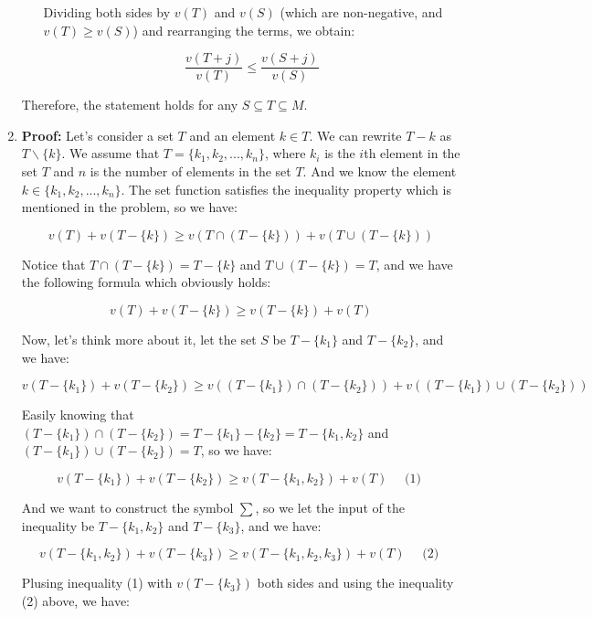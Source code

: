 \documentclass{article}
\begin{document}
\begin{enumerate}
\begin{enumerate}
      Dividing both sides by $v(T)$ and $v(S)$ (which are non-negative, and $v(T) \ge v(S)$) and rearranging the terms, we obtain:
   
      \[
         \frac{v(T+j)}{v(T)} \le \frac{v(S+j)}{v(S)}
      \]

   \end{enumerate}

   Therefore, the statement holds for any $S \subseteq T \subseteq M$.
   
   
   
   

   \item \textbf{Proof:}
   Let's consider a set $T$ and an element $k \in T$. We can rewrite $T-k$ as $T \backslash \{k\}$. We assume that $ T = \{ k_1, k_2, ..., k_n \} $, where $k_i$ is the $i$th element in the set $T$ and $n$ is the number of elements in the set $T$. And we know the element $k \in \{ k_1, k_2, ..., k_n \}$.
   The set function satisfies the inequality property which is mentioned in the problem, so we have:
   
   \[
      v(T ) + v(T - \{k\}) \ge v(T \cap (T - \{k\})) + v(T \cup (T - \{k\}))
   \]
   
   Notice that $T \cap (T - \{k\}) = T - \{k\} $ and $T \cup (T - \{k\}) = T$, and we have the following formula which obviously holds:
   
   \[
      v(T ) + v(T - \{k\}) \ge v(T - \{k\}) + v(T)   
   \]
   
   
   Now, let's think more about it, let the set $S$ be $T - \{k_1\}$ and $T - \{k_2\}$, and we have:

   \[
      v(T - \{k_1\}) + v(T - \{k_2\}) \ge v((T - \{k_1\}) \cap (T - \{k_2\})) + v((T - \{k_1\}) \cup (T - \{k_2\}))
   \]
   
   Easily knowing that $(T - \{k_1\}) \cap (T - \{k_2\}) = T - \{k_1\} - \{k_2\} = T - \{k_1, k_2\}$ and $(T - \{k_1\}) \cup (T - \{k_2\}) = T$, so we have:

   \[
      v(T - \{k_1\}) + v(T - \{k_2\}) \ge v(T - \{k_1, k_2\}) + v(T) \quad \text{ (1) }
   \]

   And we want to construct the symbol $\sum$, so we let the input of the inequality be $T - \{k_1,k_2\}$ and $T - \{k_3\}$, and we have:

   \[
      v(T - \{k_1,k_2\}) + v(T - \{k_3\}) \ge v(T - \{k_1,k_2,k_3\}) + v(T) \quad \text{ (2) }
   \]

   Plusing inequality (1) with $v(T - \{k_3\})$ both sides and using the inequality (2) above, we have:


\end{enumerate}
\end{document}
